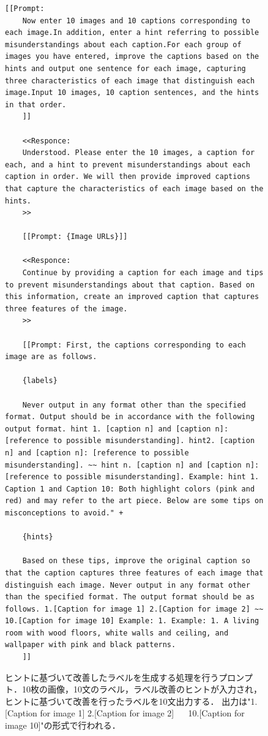 \documentclass[a4paper,11pt]{jreport}
\begin{document}
\begin{figure}[h]
  \centering
  \begin{mdframed}
  \begin{lstlisting}[style=chatgptstyle]
    [[Prompt: 
    Now enter 10 images and 10 captions corresponding to each image.In addition, enter a hint referring to possible misunderstandings about each caption.For each group of images you have entered, improve the captions based on the hints and output one sentence for each image, capturing three characteristics of each image that distinguish each image.Input 10 images, 10 caption sentences, and the hints in that order.
    ]]

    <<Responce: 
    Understood. Please enter the 10 images, a caption for each, and a hint to prevent misunderstandings about each caption in order. We will then provide improved captions that capture the characteristics of each image based on the hints.
    >>

    [[Prompt: {Image URLs}]]

    <<Responce: 
    Continue by providing a caption for each image and tips to prevent misunderstandings about that caption. Based on this information, create an improved caption that captures three features of the image.
    >>

    [[Prompt: First, the captions corresponding to each image are as follows.

    {labels}

    Never output in any format other than the specified format. Output should be in accordance with the following output format. hint 1. [caption n] and [caption n]: [reference to possible misunderstanding]. hint2. [caption n] and [caption n]: [reference to possible misunderstanding]. ~~ hint n. [caption n] and [caption n]: [reference to possible misunderstanding]. Example: hint 1. Caption 1 and Caption 10: Both highlight colors (pink and red) and may refer to the art piece. Below are some tips on misconceptions to avoid." + 

    {hints}

    Based on these tips, improve the original caption so that the caption captures three features of each image that distinguish each image. Never output in any format other than the specified format. The output format should be as follows. 1.[Caption for image 1] 2.[Caption for image 2] ~~ 10.[Caption for image 10] Example: 1. Example: 1. A living room with wood floors, white walls and ceiling, and wallpaper with pink and black patterns.
    ]]
  \end{lstlisting}
  \end{mdframed}
  \caption{ヒントに基づいて改善したラベルを生成する処理を行うプロンプト．10枚の画像，10文のラベル，ラベル改善のヒントが入力され，ヒントに基づいて改善を行ったラベルを10文出力する．
  出力は"1.[Caption for image 1] 2.[Caption for image 2] ~~ 10.[Caption for image 10]"の形式で行われる．}
  \label{fig:prompt_speaker2}
\end{figure}
\end{document}
